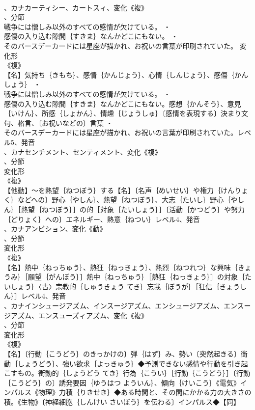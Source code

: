 \documentclass[8pt]{extreport}
\begin{document}
\begin{CJK}{UTF8}{min}
\\	、カナカーティシー、カートスィ、変化《複》
\\	、分節
\\	戦争には憎しみ以外のすべての感情が欠けている。 ・
\\	感傷の入り込む隙間｛すきま｝なんかどこにもない。 ・
\\	そのバースデーカードには星座が描かれ、お祝いの言葉が印刷されていた。	変化形 
\\	《複》
\\	【名】気持ち｛きもち｝、感情｛かんじょう｝、心情｛しんじょう｝、感傷｛かんしょう｝ ・
\\	戦争には憎しみ以外のすべての感情が欠けている。 ・
\\	感傷の入り込む隙間｛すきま｝なんかどこにもない。感想｛かんそう｝、意見｛いけん｝、所感｛しょかん｝、情趣｛じょうしゅ｝〔感情を表現する〕決まり文句、格言、〔お祝いなどの〕言葉 ・
\\	そのバースデーカードには星座が描かれ、お祝いの言葉が印刷されていた。レベル5、発音
\\	、カナセンチメント、センティメント、変化《複》
\\	、分節
\\	変化形 
\\	《複》
\\	【他動】～を熱望｛ねつぼう｝する【名】〔名声｛めいせい｝や権力｛けんりょく｝などへの〕野心｛やしん｝、熱望｛ねつぼう｝、大志｛たいし｝野心｛やしん｝［熱望｛ねつぼう｝］の的［対象｛たいしょう｝］〔活動｛かつどう｝や努力｛どりょく｝への〕エネルギー、熱意｛ねつい｝レベル4、発音
\\	、カナアンビション、変化《動》
\\	、分節
\\	変化形 
\\	《複》
\\	【名】熱中｛ねっちゅう｝、熱狂｛ねっきょう｝、熱烈｛ねつれつ｝な興味｛きょうみ｝［願望｛がんぼう｝］熱中｛ねっちゅう｝［熱狂｛ねっきょう｝］の対象｛たいしょう｝〈古〉宗教的｛しゅうきょう てき｝忘我｛ぼうが｝［狂信｛きょうしん｝］レベル4、発音
\\	、カナインシュージアズム、インスージアズム、エンシュージアズム、エンスージアズム、エンスューズィアズム、変化《複》
\\	、分節
\\	変化形 
\\	《複》
\\	【名】〔行動｛こうどう｝のきっかけの〕弾｛はず｝み、勢い〔突然起きる〕衝動｛しょうどう｝、強い欲求｛よっきゅう｝◆予測できない感情や行動を引き起こすもの。衝動的｛しょうどう てき｝行為｛こうい｝［行動｛こうどう｝］〔行動｛こうどう｝の〕誘発要因｛ゆうはつ よういん｝、傾向｛けいこう｝《電気》インパルス《物理》力積｛りきせき｝◆ある時間と、その間にかかる力の大きさの積。《生物》〔神経細胞｛しんけい さいぼう｝を伝わる〕インパルス◆【同】

\end{CJK}
\end{document}
